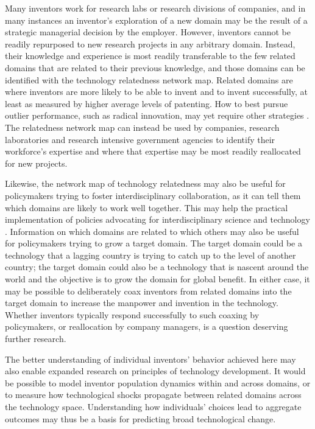 \documentclass{dsj}
\begin{document}
Many inventors work for research labs or research divisions of companies, and in many instances an inventor's exploration of a new domain may be the result of a strategic managerial decision by the employer.
However, inventors cannot be readily repurposed to new research projects in any arbitrary domain. Instead, their knowledge and experience is most readily transferable to the few related domains that are related to their previous knowledge, and those domains can be identified with the technology relatedness network map. Related domains are where inventors are more likely to be able to invent and to invent successfully, at least as measured by higher average levels of patenting. How to best pursue outlier performance, such as radical innovation, may yet require other strategies \cite{Uzzi2013,Kim2016}. The relatedness network map can instead be used by companies, research laboratories and research intensive government agencies to identify their workforce's expertise and where that expertise may be most readily reallocated for new projects.

Likewise, the network map of technology relatedness may also be useful for policymakers trying to foster interdisciplinary collaboration, as it can tell them which domains are likely to work well together. This may help the practical implementation of policies advocating for interdisciplinary science and technology \cite{Clough2004, Olson2013, EURAB2004}. Information on which domains are related to which others may also be useful for policymakers trying to grow a target domain. The target domain could be a technology that a lagging country is trying to catch up to the level of another country; the target domain could also be a technology that is nascent around the world and the objective is to grow the domain for global benefit. In either case, it may be possible to deliberately coax inventors from related domains into the target domain to increase the manpower and invention in the technology. Whether inventors typically respond successfully to such coaxing by policymakers, or reallocation by company managers, is a question deserving further research.


The better understanding of individual inventors' behavior achieved here may also enable expanded research on principles of technology development. It would be possible to model inventor population dynamics within and across domains, or to measure how technological shocks propagate between related domains across the technology space. Understanding how individuals' choices lead to aggregate outcomes may thus be a basis for predicting broad technological change.
\end{document}
